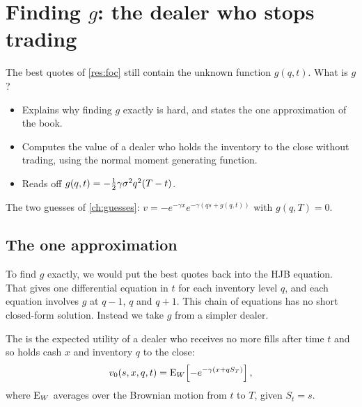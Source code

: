 \chapter{Finding \texorpdfstring{$g$}{g}: the dealer who stops trading}
\label{ch:g}

\begin{question}
The best quotes of \cref{res:foc} still contain the unknown function $g(q,t)$. What is $g$?
\end{question}

\begin{whatfor}
\begin{itemize}
  \item Explains why finding $g$ exactly is hard, and states the one approximation of the book.
  \item Computes the value of a dealer who holds the inventory to the close without trading, using the normal moment generating function.
  \item Reads off $g(q,t)=-\tfrac12\gamma\sigma^2q^2(T-t)$.
\end{itemize}
\end{whatfor}

\begin{setup}[Setup]
The two guesses of \cref{ch:guesses}: $v=-e^{-\gamma x}e^{-\gamma(qs+g(q,t))}$ with $g(q,T)=0$.
\end{setup}

\section{The one approximation}

To find $g$ exactly, we would put the best quotes back into the HJB equation. That gives one differential equation in $t$ for each inventory level $q$, and each equation involves $g$ at $q-1$, $q$ and $q+1$. This chain of equations has no short closed-form solution. Instead we take $g$ from a simpler dealer.

\begin{definition}
\label{def:frozen}
The  is the expected utility of a dealer who receives no more fills after time $t$ and so holds cash $x$ and inventory $q$ to the close:
\[
  v_0(s,x,q,t)=\operatorname{E}_{W}\!\left[-e^{-\gamma(x+qS_T)}\right],
\]
where $\operatorname{E}_W$ averages over the Brownian motion from $t$ to $T$, given $S_t=s$.
\end{definition}

